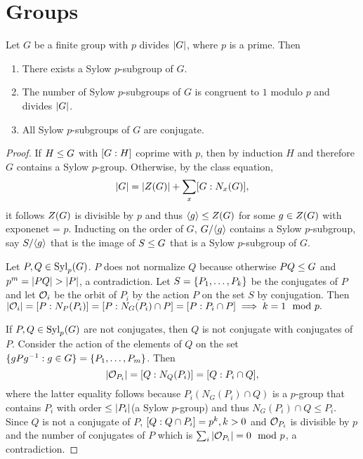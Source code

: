 \chapter{Groups}

\begin{theorem}
    Let $G$ be a finite group with $p$ divides $|G|$, where $p$ is a prime. Then
    \begin{enumerate}
        \item There exists a Sylow $p$-subgroup of $G$.
        \item The number of Sylow $p$-subgroups of $G$ is congruent to $1$ modulo $p$ and divides $|G|$.
        \item All Sylow $p$-subgroups of $G$ are conjugate.
    \end{enumerate}
\end{theorem}

\begin{proof}
    If $H \leq G$ with $[G : H]$ coprime with $p$, then by induction $H$ and therefore $G$ contains a Sylow $p$-group. Otherwise, by the class equation,
    $$|G| = |Z(G)| +  \sum_{x} [G : N_x(G)], $$
    it follows $Z(G)$ is divisible by $p$ and thus $\langle g \rangle \leq Z(G)$ for some $g \in Z(G)$ with exponenet = $p$. Inducting on the order of $G$, $G/\langle g \rangle$ contains a Sylow $p$-subgroup, say $S/\langle g \rangle$ that is the image of $S \leq G$ that is a Sylow $p$-subgroup of $G$. 
    
    Let $P, Q \in \text{Syl}_p(G)$. $P$ does not normalize $Q$ because otherwise $PQ \leq G$ and $p^m = |PQ| > |P|$, a contradiction. Let $S = \{P_1, \dots, P_k\}$ be the conjugates of $P$ and let $\mathcal{O}_{i}$ be the orbit of $P_i$ by the action $P$ on the  set $S$ by conjugation. Then $|\mathcal{O}_{i}| = [P : N_P(P_i)] = [P : N_G(P_i) \cap P] = [P : P_i \cap P] \implies k = 1 \mod p.$

    If $P, Q \in \text{Syl}_p(G)$ are not conjugates, then $Q$ is not conjugate with conjugates of $P$.
    Consider the action of the elements of $Q$ on the set $\{gPg^{-1} : g \in G\} = \{P_1, \dots, P_m\}$. Then 
    $$|\mathcal{O}_{P_i}| = [Q : N_Q(P_i)] = [Q : P_i \cap Q], $$
    where the latter equality follows because $P_i(N_G(P_i) \cap Q)$ is a $p$-group that contains $P_i$ with order $\leq |P_i|$(a Sylow $p$-group) and thus $ N_G(P_i)\cap Q \leq P_i$. Since $Q$ is not a conjugate of $P$, $[Q : Q \cap P_i] = p^k, k > 0$ and $ \mathcal{O}_{P_i}$ is divisible by $p$ and the number of conjugates of $P$ which is $\sum_i |\mathcal{O}_{P_i}| = 0 \mod p$, a contradiction.
    \end{proof}